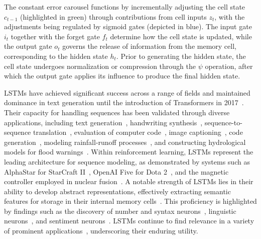 The constant error carousel functions by incrementally adjusting the cell state $c_{t-1}$ (highlighted in green) through contributions from cell inputs $z_t$, with the adjustments being regulated by sigmoid gates (depicted in blue). The input gate $i_t$ together with the forget gate $f_t$ determine how the cell state is updated, while the output gate $o_t$ governs the release of information from the memory cell, corresponding to the hidden state $h_t$. Prior to generating the hidden state, the cell state undergoes normalization or compression through the $\psi$ operation, after which the output gate applies its influence to produce the final hidden state.

LSTMs have achieved significant success across a range of fields \citep{Hochreiter:01,Hochreiter:07,Schmidhuber:15} and maintained dominance in text generation until the introduction of Transformers in 2017~\citep{Vaswani:17}. Their capacity for handling sequences has been validated through diverse applications, including text generation~\citep{Graves:13,Karpathy:15blog}, handwriting synthesis~\citep{Graves:13}, sequence-to-sequence translation~\citep{Sutskever:14nips}, evaluation of computer code~\citep{Zaremba:14arxiv}, image captioning~\citep{Karpathy:15,Hossain:19}, code generation~\citep{Karpathy:15blog}, modeling rainfall-runoff processes~\citep{Kratzert:18,Kratzert:19}, and constructing hydrological models for flood warnings~\citep{Nearing:24}. Within reinforcement learning, LSTMs represent the leading architecture for sequence modeling, as demonstrated by systems such as AlphaStar for StarCraft II~\citep{Vinyals:17short}, OpenAI Five for Dota 2~\citep{OpenAI:19}, and the magnetic controller employed in nuclear fusion~\citep{Degrave:22short}. A notable strength of LSTMs lies in their ability to develop abstract representations, effectively extracting semantic features for storage in their internal memory cells~\citep{Karpathy:15blog}. This proficiency is highlighted by findings such as the discovery of number and syntax neurons~\citep{Lakretz:19}, linguistic neurons~\citep{Bau:19}, and sentiment neurons~\citep{Radford:17arxiv}. LSTMs continue to find relevance in a variety of prominent applications~\citep{Degrave:22short,Nearing:24}, underscoring their enduring utility.

